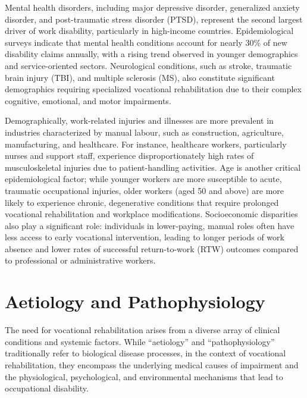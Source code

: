 Mental health disorders, including major depressive disorder, generalized anxiety disorder, and post-traumatic stress disorder (PTSD), represent the second largest driver of work disability, particularly in high-income countries. Epidemiological surveys indicate that mental health conditions account for nearly 30\% of new disability claims annually, with a rising trend observed in younger demographics and service-oriented sectors. Neurological conditions, such as stroke, traumatic brain injury (TBI), and multiple sclerosis (MS), also constitute significant demographics requiring specialized vocational rehabilitation due to their complex cognitive, emotional, and motor impairments.

Demographically, work-related injuries and illnesses are more prevalent in industries characterized by manual labour, such as construction, agriculture, manufacturing, and healthcare. For instance, healthcare workers, particularly nurses and support staff, experience disproportionately high rates of musculoskeletal injuries due to patient-handling activities. Age is another critical epidemiological factor; while younger workers are more susceptible to acute, traumatic occupational injuries, older workers (aged 50 and above) are more likely to experience chronic, degenerative conditions that require prolonged vocational rehabilitation and workplace modifications. Socioeconomic disparities also play a significant role: individuals in lower-paying, manual roles often have less access to early vocational intervention, leading to longer periods of work absence and lower rates of successful return-to-work (RTW) outcomes compared to professional or administrative workers.

\section*{Aetiology and Pathophysiology}
The need for vocational rehabilitation arises from a diverse array of clinical conditions and systemic factors. While ``aetiology'' and ``pathophysiology'' traditionally refer to biological disease processes, in the context of vocational rehabilitation, they encompass the underlying medical causes of impairment and the physiological, psychological, and environmental mechanisms that lead to occupational disability.

